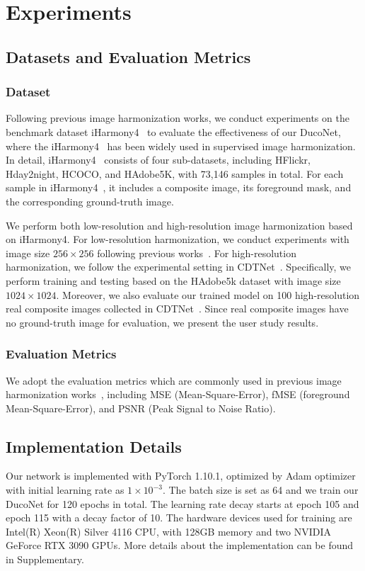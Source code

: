 \documentclass[sigconf]{acmart}
\begin{document}
\section{Experiments}
\subsection{Datasets and Evaluation Metrics}
\subsubsection{Dataset} 
Following previous image harmonization works, we conduct experiments on the benchmark dataset iHarmony4~\cite{dovenet} to evaluate the effectiveness of our DucoNet, where the iHarmony4~\cite{dovenet} has been widely used in supervised image harmonization. 
In detail, iHarmony4~\cite{dovenet} consists of four sub-datasets, including HFlickr, Hday2night, HCOCO, and HAdobe5K, with 73,146 samples in total.
For each sample in iHarmony4~\cite{dovenet}, it includes a composite image, its foreground mask, and the corresponding ground-truth image.

We perform both low-resolution and high-resolution image harmonization based on iHarmony4. 
For low-resolution harmonization, we conduct experiments with image size $256 \times 256$ following previous works~\cite{issam}.
For high-resolution harmonization, we follow the experimental setting in CDTNet~\cite{CDTNet}. Specifically, we perform training and testing based on the HAdobe5k dataset with image size $1024 \times 1024$. 
Moreover, we also evaluate our trained model on 100 high-resolution real composite images collected in CDTNet~\cite{CDTNet}. 
Since real composite images have no ground-truth image for evaluation, we present the user study results.

\subsubsection{Evaluation Metrics} 
We adopt the evaluation metrics which are commonly used in previous image harmonization works~\cite{dovenet,IHT,issam,CDTNet,harmonizer,DCCF}, including MSE (Mean-Square-Error), fMSE (foreground Mean-Square-Error), and PSNR (Peak Signal to Noise Ratio).

\subsection{Implementation Details}

Our network is implemented with PyTorch 1.10.1, optimized by Adam optimizer with initial learning rate as $1\times 10^{-3}$.
The batch size is set as 64 and we train our DucoNet for 120 epochs in total.
The learning rate decay starts at epoch 105 and epoch 115 with a decay factor of 10. 
The hardware devices used for training are Intel(R) Xeon(R) Silver 4116 CPU, with 128GB memory and two NVIDIA GeForce RTX 3090 GPUs.
More details about the implementation can be found in Supplementary.
\end{document}
